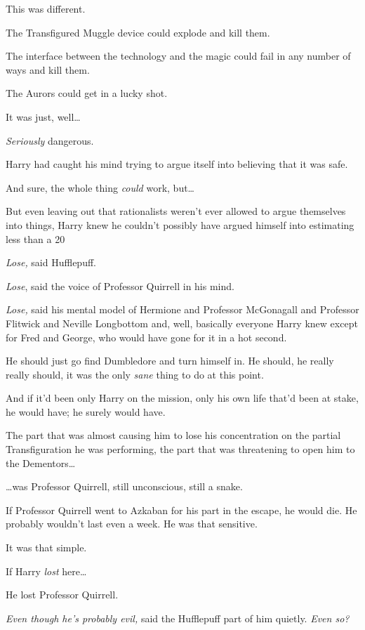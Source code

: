 This was different.

The Transfigured Muggle device could explode and kill them.

The interface between the technology and the magic could fail in any number of 
ways and kill them.

The Aurors could get in a lucky shot.

It was just, well{\ldots}

\emph{Seriously} dangerous.

Harry had caught his mind trying to argue itself into believing that it was 
safe.

And sure, the whole thing \emph{could} work, but{\ldots}

But even leaving out that rationalists weren't ever allowed to argue themselves 
into things, Harry knew he couldn't possibly have argued himself into 
estimating less than a 20%

\emph{Lose,} said Hufflepuff.

\emph{Lose}, said the voice of Professor Quirrell in his mind.

\emph{Lose,} said his mental model of Hermione and Professor McGonagall and 
Professor Flitwick and Neville Longbottom and, well, basically everyone Harry 
knew except for Fred and George, who would have gone for it in a hot second.

He should just go find Dumbledore and turn himself in. He should, he really 
really should, it was the only \emph{sane} thing to do at this point.

And if it'd been only Harry on the mission, only his own life that'd been at 
stake, he would have; he surely would have.

The part that was almost causing him to lose his concentration on the partial 
Transfiguration he was performing, the part that was threatening to open him to 
the Dementors{\ldots}

{\ldots}was Professor Quirrell, still unconscious, still a snake.

If Professor Quirrell went to Azkaban for his part in the escape, he would die. 
He probably wouldn't last even a week. He was that sensitive.

It was that simple.

If Harry \emph{lost} here{\ldots}

He lost Professor Quirrell.

\emph{Even though he's probably evil,} said the Hufflepuff part of him quietly. 
\emph{Even so?}

